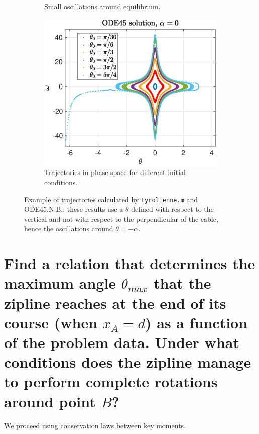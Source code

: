 \documentclass[11pt,a4paper]{exam}
\begin{document}
\begin{parts}
\begin{figure}
\begin{subfigure}{.45\textwidth}
      \caption{Small oscillations around equilibrium.}
        \label{fig:solution_petites_oscillations}
    \end{subfigure}%
    \begin{subfigure}{.55\textwidth}
      \centering
        \includegraphics[width=0.95\linewidth]{ExoFig/tyr_solution_espace_de_phase.eps}
      \caption{Trajectories in phase space for different initial conditions.}
        \label{fig:espace_phase}
    \end{subfigure}
    \caption{Example of trajectories calculated by \texttt{tyrolienne.m} and ODE45.N.B.: these results use a $\theta$ defined with respect to the vertical and not with respect to the perpendicular of the cable, hence the oscillations around $\theta=-\alpha$.}
    \label{fig:test}
    \end{figure}



\part{Find a relation that determines the maximum angle $\theta_{max}$ that the zipline reaches at the end of its course (when $x_A=d$) as a function of the problem data. 
Under what conditions does the zipline manage to perform complete rotations around point $B$?}
    \par\vspace{2mm}
    We proceed using conservation laws between key moments.

\end{parts}
\end{document}
